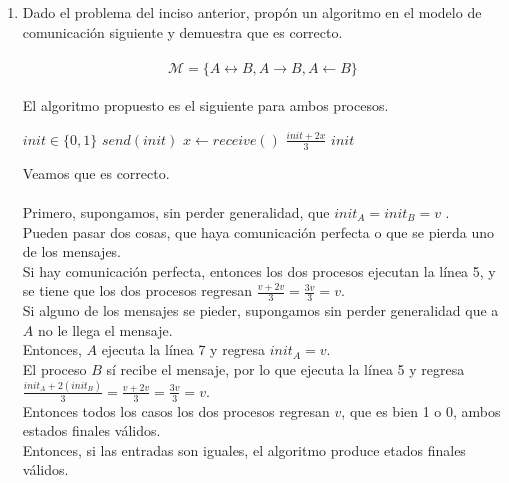 \documentclass[12pt,a4paper]{report}
\begin{document}
\begin{enumerate}
{\begin{tikzpicture}
		\end{tikzpicture}
	}
	\item {
	Dado el problema del inciso anterior, propón un algoritmo en el modelo de
	comunicación siguiente y demuestra que es correcto.\\\\
		\begin{equation*}
			\mathcal{M} = \{A \leftrightarrow B, A \rightarrow B, A \leftarrow B \}
		\end{equation*}\\
	El algoritmo propuesto es el siguiente para ambos procesos.\\
		\begin{algorithmic}[1]
			\Require $init \in \{0, 1\}$
				\State $send(init)$
				\State $x \gets receive()$
					\State \Return $\frac{init + 2x}{3}$
				\Else
					\State \Return $init$
				\EndIf
			\EndFunction
		\end{algorithmic}
	Veamos que es correcto.\\\\

	Primero, supongamos, sin perder generalidad, que $init_A = init_B = v$ .\\
	Pueden pasar dos cosas, que haya comunicación perfecta o que se pierda uno
	de los mensajes.\\
	Si hay comunicación perfecta, entonces los dos procesos ejecutan la línea 5,
	y se tiene que los dos procesos regresan $\frac{v + 2v}{3} = \frac{3v}{3} = v$.\\
	Si alguno de los mensajes se pieder, supongamos sin perder generalidad que a $A$
	no le llega el mensaje.\\
	Entonces, $A$ ejecuta la línea 7 y regresa $init_A = v$.\\
	El proceso $B$ sí recibe el mensaje, por lo que ejecuta la línea 5 y regresa
	$\frac{init_A + 2 (init_B)}{3} = \frac{v + 2v}{3} = \frac{3v}{3} = v$.\\
	Entonces todos los casos los dos procesos regresan $v$, que es bien 1 o 0,
	ambos estados finales válidos.\\
	Entonces, si las entradas son iguales, el algoritmo produce etados finales válidos.\\\\

}
\end{enumerate}
\end{document}
